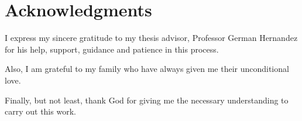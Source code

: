\cleardoublepage
\chapter*{Acknowledgments}

\begin{flushleft}
	I express my sincere gratitude to my thesis advisor, Professor German Hernandez for his help, support, guidance and patience in this process.
\end{flushleft}

\begin{flushleft}
	Also, I am grateful to my family who have always given me their unconditional love.
\end{flushleft}

\begin{flushleft}
	Finally, but not least, thank God for giving me the necessary understanding to carry out this work.
\end{flushleft}
